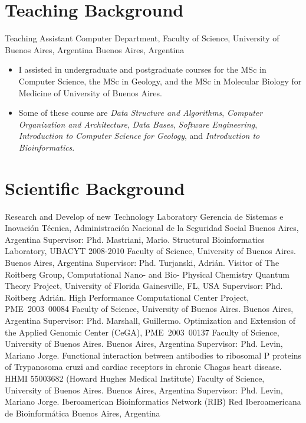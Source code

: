 \documentclass[9pt,a4paper,sans]{moderncv}
\newcommand{\ts}{\textsuperscript}
\newcommand{\Q}{{\textsf{Q}\hspace*{-1.1ex}%
  \rule{0.15ex}{1.5ex}\hspace*{1.1ex}}}
\newcommand{\Cuat}{\ts{o}\Q~}
\newcommand{\actual}{$\infty$}
\newcommand{\DC}{Computer Department}
\newcommand{\FCEN}{Faculty of Science}
\newcommand{\UBA}{University of Buenos Aires}
\begin{document}
\section{Teaching Background}\label{docentes:desde}

        {Teaching Assistant}
	{\DC, \FCEN, \UBA, Argentina}
	{Buenos Aires, Argentina}
	{}
	{\begin{itemize}
	\item I assisted in undergraduate and postgraduate courses for the MSc in Computer Science,
		the MSc in Geology, and the MSc in Molecular Biology for Medicine of University of Buenos Aires.
	\item Some of these course are \emph{Data Structure and Algorithms},
		\emph{Computer Organization and Architecture}, \emph{Data Bases},
		\emph{Software Engineering}, \emph{Introduction to Computer Science for Geology},
		and \emph{Introduction to Bioinformatics}.
	\end{itemize}}

\section{Scientific Background}\label{cientificos:desde}

	{Research and Develop of new Technology Laboratory}
	{Gerencia de Sistemas e Inovación Técnica, Administración Nacional de la Seguridad Social}
	{Buenos Aires, Argentina}
	{}
	{Supervisor: Phd. Mastriani, Mario.}
	{Structural Bioinformatics Laboratory, UBACYT 2008-2010}
	{\FCEN, \UBA.}
	{Buenos Aires, Argentina}
	{}
	{Supervisor: Phd. Turjanski, Adrián.}
\cventry{2\Cuat 2007}
        {Visitor of The Roitberg Group, Computational Nano- and Bio- Physical Chemistry}
	{Quantum Theory Project, University of Florida}
	{Gainesville, FL, USA}
	{}
	{Supervisor: Phd. Roitberg Adrián.}
	{High Performance Computational Center Project, PME~2003~00084}
	{\FCEN, \UBA.}
	{Buenos Aires, Argentina}
	{}
	{Supervisor: Phd. Marshall, Guillermo.}
        {Optimization and Extension of the Applied Genomic Center (CeGA), PME~2003~00137}
	{\FCEN, \UBA.}
	{Buenos Aires, Argentina}
	{}
	{Supervisor: Phd. Levin, Mariano Jorge.}
	{Functional interaction between antibodies to ribosomal P proteins of Trypanosoma cruzi and cardiac receptors in chronic Chagas heart disease. HHMI 55003682 (Howard Hughes Medical Institute)}
	{\FCEN, \UBA.}
	{Buenos Aires, Argentina}
	{}
	{Supervisor: Phd. Levin, Mariano Jorge.}
\cventry{2002-\actual}
	{Iberoamerican Bioinformatics Network (RIB)}
	{Red Iberoamericana de Bioinformática}
	{Buenos Aires, Argentina}
	{}
	{}
\end{document}
